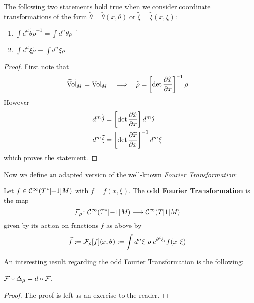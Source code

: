 \begin{lem}
  The following two statements hold true when we consider coordinate transformations of the form $\widetilde{\theta} = \widetilde{\theta}(x, \theta)$ or $\widetilde{\xi} = \widetilde{\xi}(x, \xi)$:
  \begin{enumerate}
    \item $ \int d^n \widetilde{\theta} \widetilde{\rho}^{-1} = \int d^n \theta \rho^{-1} $
    \item $ \int d^n \widetilde{\xi} \widetilde{\rho} = \int d^n \xi \rho $
  \end{enumerate}
\begin{proof}
  First note that
  \begin{equation}
    \widetilde{\operatorname{Vol}}_M = \operatorname{Vol}_M \quad \Longrightarrow \quad \widetilde{\rho} = \left[ \det \frac{\partial \widetilde{x}}{\partial x} \right]^{-1} \rho
  \end{equation}
  However
  \begin{align}
    d^m \widetilde{\theta} &= \left[ \det \frac{\partial \widetilde{x}}{\partial x} \right] d^m \theta \\
    d^m \widetilde{\xi} &= \left[ \det \frac{\partial \widetilde{x}}{\partial x} \right]^{-1} d^m \xi
  \end{align}
  which proves the statement.
\end{proof}
\end{lem}

Now we define an adapted version of the well-known \emph{Fourier Transformation}:

\begin{definition}
  Let $f \in \mathcal{C}^{\infty}(T^*[-1]M)$ with $f = f(x, \xi)$. The \textbf{odd Fourier Transformation} is the map
  \begin{equation}
    {\mathcal{F}}_\rho \colon \mathcal{C}^{\infty}(T^*[-1]M) \longrightarrow \mathcal{C}^{\infty}(T[1]M)
  \end{equation}
  given by its action on functions $f$ as above by
  \begin{equation}
    \widetilde{f} := {\mathcal{F}}_\rho [f](x, \theta) := \int d^n \xi \ \rho \ e^{\theta^i \xi_i} f(x, \xi)
  \end{equation}
\end{definition}

An interesting result regarding the odd Fourier Transformation is the following:

\begin{prop}
  ${\mathcal{F}} \circ \Delta_\mu = d \circ {\mathcal{F}}$.
\begin{proof}
  The proof is left as an exercise to the reader.
\end{proof}
\end{prop}

